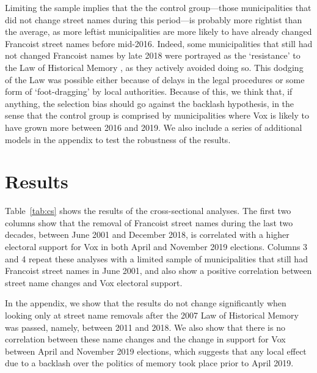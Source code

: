 \documentclass[12pt, notitlepage]{article}
\begin{document}


Limiting the sample implies that the the control group---those municipalities that did not change street names during this period---is probably more rightist than the average, as more leftist municipalities are more likely to have already changed Francoist street names before mid-2016.
Indeed, some municipalities that still had not changed Francoist names by late 2018 were portrayed as the `resistance' to the Law of Historical Memory \citep{Blanco-Elipe:2018aa}, as they actively avoided doing so.
This dodging of the Law was possible either because of delays in the legal procedures or some form of `foot-dragging' by local authorities.
Because of this, we think that, if anything, the selection bias should go against the backlash hypothesis, in the sense that the control group is comprised by municipalities where Vox is likely to have grown more between 2016 and 2019.
We also include a series of additional models in the appendix to test the robustness of the results.


\section*{Results}

Table~\ref{tab:cs} shows the results of the cross-sectional analyses.
The first two columns show that the removal of Francoist street names during the last two decades, between June 2001 and December 2018, is correlated with a higher electoral support for Vox in both April and November 2019 elections.
Columns 3 and 4 repeat these analyses with a limited sample of municipalities that still had Francoist street names in June 2001, and also show a positive correlation between street name changes and Vox electoral support.



In the appendix, we show that the results do not change significantly when looking only at street name removals after the 2007 Law of Historical Memory was passed, namely, between 2011 and 2018.
We also show that there is no correlation between these name changes and the change in support for Vox between April and November 2019 elections, which suggests that any local effect due to a backlash over the politics of memory took place prior to April 2019.
\end{document}
